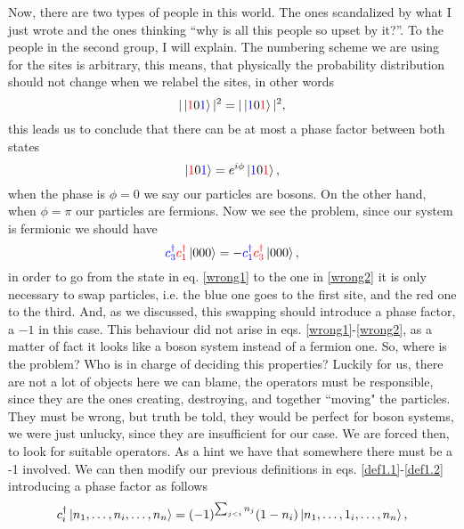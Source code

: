Now, there are two types of people in this world. The ones scandalized by what I just wrote and the ones thinking ``why is all this people so upset by it?''. To the people in the second group, I will explain. The numbering scheme we are using for the sites is arbitrary, this means, that physically the probability distribution should not change when we relabel the sites, in other words
\begin{equation}
    |\ket{\textcolor{red}{1}0\textcolor{blue}{1}}|^2 = |\ket{\textcolor{blue}{1}0\textcolor{red}{1}}|^2 ,
\end{equation}
this leads us to conclude that there can be at most a phase factor between both states
\begin{equation}
    \ket{\textcolor{red}{1}0\textcolor{blue}{1}} = e^{i\phi} \ket{\textcolor{blue}{1}0\textcolor{red}{1}},%
\end{equation}
when the phase is $\phi=0$ we say our particles are bosons. On the other hand, when $\phi=\pi$ our particles are fermions. Now we see the problem, since our system is fermionic we should have
\begin{equation}
    \textcolor{blue}{c_3^\dagger}\textcolor{red}{c_1^\dagger}\ket{000} = - \textcolor{blue}{c_1^\dagger}\textcolor{red}{c_3^\dagger}\ket{000},
    \label{right1}
\end{equation}
in order to go from the state in eq. \ref{wrong1} to the one in \ref{wrong2} it is only necessary to swap particles, i.e. the blue one goes to the first site, and the red one to the third. And, as we discussed, this swapping should introduce a phase factor, a $-1$ in this case. This behaviour did not arise in eqs. \ref{wrong1}-\ref{wrong2}, as a matter of fact it looks like a boson system instead of a fermion one. So, where is the problem? Who is in charge of deciding this properties? Luckily for us, there are not a lot of objects here we can blame, the operators must be responsible, since they are the ones creating, destroying, and together ``moving" the particles. They must be wrong, but truth be told, they would be perfect for boson systems, we were just unlucky, since they are insufficient for our case. We are forced then, to look for suitable operators. As a hint we have that somewhere there must be a -1 involved. We can then modify our previous definitions in eqs. \ref{def1.1}-\ref{def1.2} introducing a phase factor as follows
\begin{equation}
  c_i^\dagger \ket{n_1,\ldots,n_i,\ldots,n_n} =(-1)^{\sum_{j<i}n_j} (1-n_i)\ket{n_1,\ldots,1_i,\ldots,n_n},
\end{equation}
